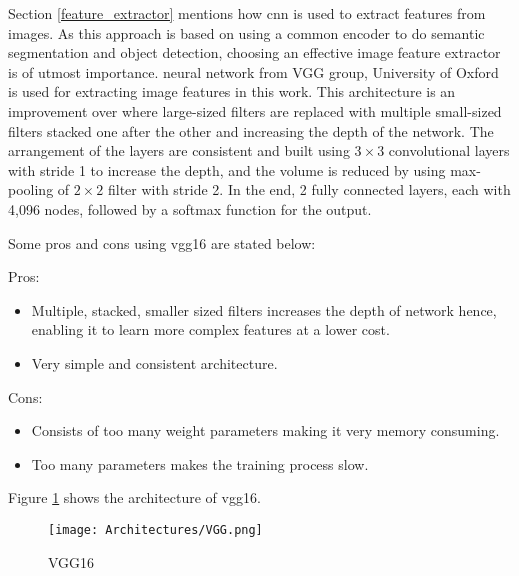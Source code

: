 Section \ref{feature_extractor} mentions how \ac{cnn} is used to extract features from images. As this approach is based on using a common encoder to do semantic segmentation and object detection, choosing an effective image feature extractor is of utmost importance. \cite{simonyan2014very} neural network from VGG group, University of Oxford is used for extracting image features in this work. This architecture is an improvement over \cite{krizhevsky2012imagenet} where large-sized filters are replaced with multiple small-sized filters stacked one after the other and increasing the depth of the network. The arrangement of the layers are consistent and built using $3\times3$ convolutional layers with stride 1 to increase the depth, and the volume is reduced by using max-pooling of $2\times2$ filter with stride 2. In the end, 2 fully connected layers, each with 4,096 nodes, followed by a softmax function for the output. 



\par
Some pros and cons using \ac{vgg}16 are stated below:
\par
Pros:
\begin{itemize}
    \item Multiple, stacked,  smaller sized filters increases the depth of network hence, enabling it to learn more complex features at a lower cost. 
    \item Very simple and consistent architecture.
\end{itemize}
\par
Cons:
\begin{itemize}
    \item Consists of too many weight parameters making it very memory consuming.
    \item Too many parameters makes the training process slow.
\end{itemize}

\par
Figure \ref{VGG} shows the architecture of \ac{vgg}16. 

\begin{figure}[h!]
    \centering
    \texttt{[image: Architectures/VGG.png]}
    \caption{VGG16}
    \label{VGG}
\end{figure}

